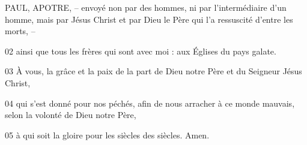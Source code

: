 PAUL, APOTRE, – envoyé non par des hommes, ni par l’intermédiaire d’un homme, mais par Jésus Christ et par Dieu le Père qui l’a ressuscité d’entre les morts, –

02 ainsi que tous les frères qui sont avec moi : aux Églises du pays galate.

03 À vous, la grâce et la paix de la part de Dieu notre Père et du Seigneur Jésus Christ,

04 qui s’est donné pour nos péchés, afin de nous arracher à ce monde mauvais, selon la volonté de Dieu notre Père,

05 à qui soit la gloire pour les siècles des siècles. Amen.
